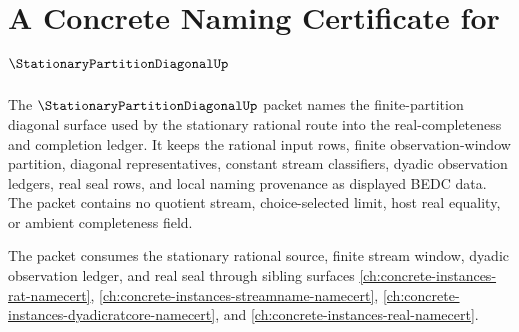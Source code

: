 \chapter{A Concrete Naming Certificate for $\StationaryPartitionDiagonalUp$}
\label{ch:concrete-instances-stationarypartitiondiagonal-namecert}

The $\StationaryPartitionDiagonalUp$ packet names the finite-partition diagonal surface used by the stationary rational route into the real-completeness and completion ledger. It keeps the rational input rows, finite observation-window partition, diagonal representatives, constant stream classifiers, dyadic observation ledgers, real seal rows, and local naming provenance as displayed BEDC data. The packet contains no quotient stream, choice-selected limit, host real equality, or ambient completeness field.

The packet consumes the stationary rational source, finite stream window, dyadic observation ledger, and real seal through sibling surfaces \autoref{ch:concrete-instances-rat-namecert}, \autoref{ch:concrete-instances-streamname-namecert}, \autoref{ch:concrete-instances-dyadicratcore-namecert}, and \autoref{ch:concrete-instances-real-namecert}.

